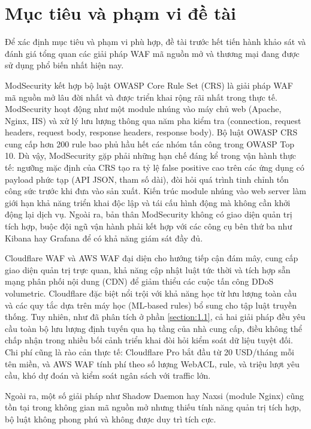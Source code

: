 \documentclass[../DoAn.tex]{subfiles}
\begin{document}
\section{Mục tiêu và phạm vi đề tài}
\label{section:1.2}

Để xác định mục tiêu và phạm vi phù hợp, đề tài trước hết tiến hành khảo sát
và đánh giá tổng quan các giải pháp WAF mã nguồn mở và thương mại đang được
sử dụng phổ biến nhất hiện nay.

ModSecurity kết hợp bộ luật OWASP Core Rule Set (CRS) là giải pháp WAF
mã nguồn mở lâu đời nhất và được triển khai rộng rãi nhất trong thực tế. ModSecurity
hoạt động như một module nhúng vào máy chủ web (Apache, Nginx, IIS) và xử lý
lưu lượng thông qua năm pha kiểm tra (connection, request headers, request body,
response headers, response body). Bộ luật OWASP CRS cung cấp hơn 200 rule
bao phủ hầu hết các nhóm tấn công trong OWASP Top 10. Dù vậy, ModSecurity
gặp phải những hạn chế đáng kể trong vận hành thực tế: ngưỡng mặc định của CRS
tạo ra tỷ lệ false positive cao trên các ứng dụng có payload phức tạp (API JSON,
tham số dài), đòi hỏi quá trình tinh chỉnh tốn công sức trước khi đưa vào sản xuất.
Kiến trúc module nhúng vào web server làm giới hạn khả năng triển khai độc lập
và tái cấu hình động mà không cần khởi động lại dịch vụ. Ngoài ra, bản thân
ModSecurity không có giao diện quản trị tích hợp, buộc đội ngũ vận hành phải
kết hợp với các công cụ bên thứ ba như Kibana hay Grafana để có khả năng giám
sát đầy đủ.

Cloudflare WAF và AWS WAF đại diện cho hướng tiếp cận đám mây, cung cấp
giao diện quản trị trực quan, khả năng cập nhật luật tức thời và tích hợp sẵn mạng
phân phối nội dung (CDN) để giảm thiểu các cuộc tấn công DDoS volumetric.
Cloudflare đặc biệt nổi trội với khả năng học từ lưu lượng toàn cầu và các quy
tắc dựa trên máy học (ML-based rules) bổ sung cho tập luật truyền thống. Tuy
nhiên, như đã phân tích ở phần \ref{section:1.1}, cả hai giải pháp đều yêu cầu
toàn bộ lưu lượng định tuyến qua hạ tầng của nhà cung cấp, điều không thể chấp
nhận trong nhiều bối cảnh triển khai đòi hỏi kiểm soát dữ liệu tuyệt đối. Chi phí
cũng là rào cản thực tế: Cloudflare Pro bắt đầu từ 20 USD/tháng mỗi tên miền,
và AWS WAF tính phí theo số lượng WebACL, rule, và triệu lượt yêu cầu, khó
dự đoán và kiểm soát ngân sách với traffic lớn.

Ngoài ra, một số giải pháp như Shadow Daemon hay Naxsi (module Nginx) cũng
tồn tại trong không gian mã nguồn mở nhưng thiếu tính năng quản trị tích hợp,
bộ luật không phong phú và không được duy trì tích cực.
\end{document}
